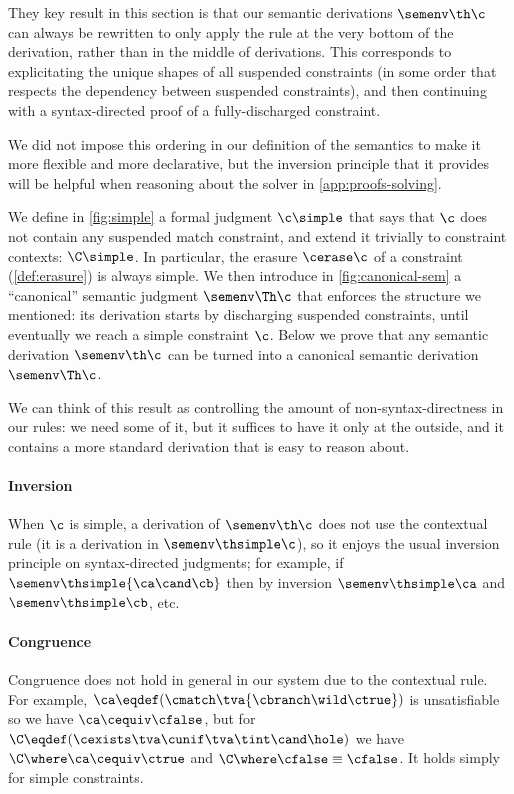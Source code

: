 \documentclass[acmsmall,screen,nonacm%
\Anonymous{,anonymous}{}%
\Final{}{,review}%
]{acmart}
\begin{document}
They key result in this section is that our semantic derivations $\semenv \th
\c$ can always be rewritten to only apply the rule  at the very
bottom of the derivation, rather than in the middle of derivations. This
corresponds to explicitating the unique shapes of all suspended constraints (in
some order that respects the dependency between suspended constraints), and
then continuing with a syntax-directed proof of a fully-discharged constraint.

We did not impose this ordering in our definition of the semantics to make it
more flexible and more declarative, but the inversion principle that it
provides will be helpful when reasoning about the solver in
\cref{app:proofs-solving}.

We define in \cref{fig:simple} a formal judgment $\c \simple$ that says that
$\c$ does not contain any suspended match constraint, and extend it trivially
to constraint contexts: $\C \simple$. In particular, the erasure $\cerase \c$
of a constraint (\cref{def:erasure}) is always simple. We then introduce in
\cref{fig:canonical-sem} a ``canonical'' semantic judgment $\semenv \Th \c$
that enforces the structure we mentioned: its derivation starts by discharging
suspended constraints, until eventually we reach a simple constraint $\c$.
Below we prove that any semantic derivation $\semenv \th \c$ can be turned into
a canonical semantic derivation $\semenv \Th \c$.

We can think of this result as controlling the amount of non-syntax-directness in our rules: we need some of it, but it suffices to have it only at the outside, and it contains a more standard derivation that is easy to reason about.

\paragraph{Inversion} When $\c$ is simple, a derivation of $\semenv \th \c$
does not use the contextual rule (it is a derivation in $\semenv \thsimple
\c$), so it enjoys the usual inversion principle on syntax-directed judgments;
for example, if $\semenv \thsimple {\ca \cand \cb}$ then by inversion $\semenv
\thsimple \ca$ and $\semenv \thsimple \cb$, etc.

\paragraph{Congruence} Congruence does not hold in general in our system due to
the contextual rule. For example, $\ca \eqdef (\cmatch \tva {\cbranch \wild
\ctrue})$ is unsatisfiable so we have $\ca \cequiv \cfalse$, but for $\C \eqdef
(\cexists \tva \cunif \tva \tint \cand \hole)$ we have $\C \where \ca \cequiv
\ctrue$ and $\C \where \cfalse \equiv \cfalse$. It holds simply for simple
constraints.
\end{document}
